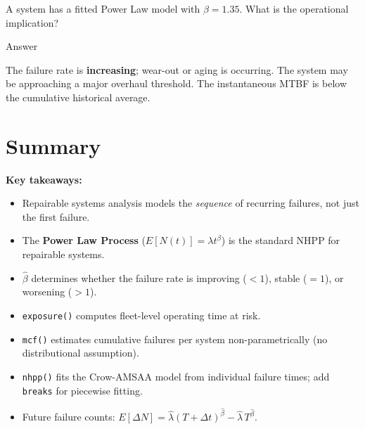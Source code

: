\documentclass[
  letterpaper,
  DIV=11,
  numbers=noendperiod]{scrreprt}
\providecommand{\tightlist}{%
  \setlength{\itemsep}{0pt}\setlength{\parskip}{0pt}}
\begin{document}
\begin{tcolorbox}[enhanced jigsaw, arc=.35mm, bottomrule=.15mm, bottomtitle=1mm, breakable, colback=white, colbacktitle=quarto-callout-tip-color!10!white, colframe=quarto-callout-tip-color-frame, coltitle=black, left=2mm, leftrule=.75mm, opacityback=0, opacitybacktitle=0.6, rightrule=.15mm, title=\textcolor{quarto-callout-tip-color}{\faLightbulb}\hspace{0.5em}{Review}, titlerule=0mm, toprule=.15mm, toptitle=1mm]

A system has a fitted Power Law model with \(\beta = 1.35\). What is the
operational implication?

Answer

The failure rate is \textbf{increasing}; wear-out or aging is occurring.
The system may be approaching a major overhaul threshold. The
instantaneous MTBF is below the cumulative historical average.

\end{tcolorbox}

\section{Summary}\label{summary-5}

\textbf{Key takeaways:}

\begin{itemize}
\tightlist
\item
  Repairable systems analysis models the \emph{sequence} of recurring
  failures, not just the first failure.
\item
  The \textbf{Power Law Process} (\(E[N(t)] = \lambda t^\beta\)) is the
  standard NHPP for repairable systems.
\item
  \(\hat{\beta}\) determines whether the failure rate is improving
  (\(< 1\)), stable (\(= 1\)), or worsening (\(> 1\)).
\item
  \texttt{exposure()} computes fleet-level operating time at risk.
\item
  \texttt{mcf()} estimates cumulative failures per system
  non-parametrically (no distributional assumption).
\item
  \texttt{nhpp()} fits the Crow-AMSAA model from individual failure
  times; add \texttt{breaks} for piecewise fitting.
\item
  Future failure counts:
  \(E[\Delta N] = \hat{\lambda}(T + \Delta t)^{\hat{\beta}} - \hat{\lambda}\,T^{\hat{\beta}}\).
\end{itemize}
\end{document}

